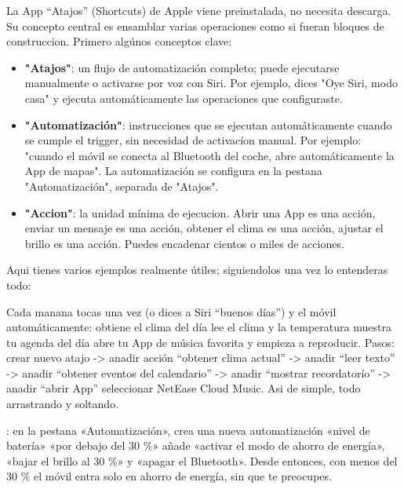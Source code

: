 
La App “Atajos” (Shortcuts) de Apple viene preinstalada, no necesita descarga. Su concepto central es ensamblar varias operaciones como si fueran bloques de construccion. Primero algúnos conceptos clave:

\begin{itemize}
  \item \textbf{"Atajos"}: un flujo de automatización completo; puede ejecutarse manualmente o activarse por voz con Siri. Por ejemplo, dices "Oye Siri, modo casa" y ejecuta automáticamente las operaciones que configuraste.
  \item \textbf{"Automatización"}: instrucciones que se ejecutan automáticamente cuando se cumple el trigger, sin necesidad de activacíon manual. Por ejemplo: "cuando el móvil se conecta al Bluetooth del coche, abre automáticamente la App de mapas". La automatización se configura en la pestana "Automatización", separada de "Atajos".
  \item \textbf{"Accion"}: la unidad mínima de ejecucion. Abrir una App es una acción, enviar un mensaje es una acción, obtener el clima es una acción, ajustar el brillo es una acción. Puedes encadenar cientos o miles de acciones.
\end{itemize}

Aqui tienes varios ejemplos realmente útiles; siguiendolos una vez lo entenderas todo:


Cada manana tocas una vez (o dices a Siri “buenos días”) y el móvil automáticamente: obtiene el clima del día lee el clima y la temperatura muestra tu agenda del día abre tu App de música favorita y empieza a reproducir. Pasos: crear nuevo atajo -> anadir acción “obtener clima actual” -> anadir “leer texto” -> anadir “obtener eventos del calendario” -> anadir “mostrar recordatorío” -> anadir “abrir App” seleccionar NetEase Cloud Music. Asi de simple, todo arrastrando y soltando.


: en la pestana «Automatización», crea una nueva automatización «nivel de batería» «por debajo del 30 \%» añade «activar el modo de ahorro de energía», «bajar el brillo al 30 \%» y «apagar el Bluetooth». Desde entonces, con menos del 30 \% el móvil entra solo en ahorro de energía, sin que te preocupes.

